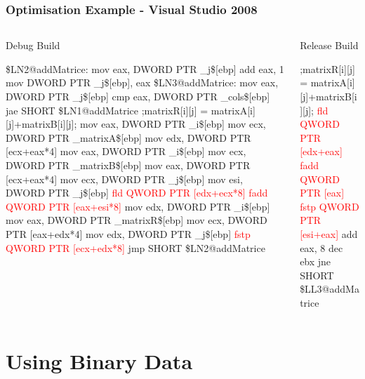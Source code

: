 \documentclass[smaller,handout,table]{beamer}
\begin{document}
\begin{frame}[fragile]
\frametitle{Optimisation Example - Visual Studio 2008}
\begin{columns}
\begin{column}{5cm}
\begin{center}
Debug Build
\end{center}
\begin{semiverbatim}
\tiny
\$LN2@addMatrice:
        mov     eax, DWORD PTR \_j\$[ebp]
        add     eax, 1
        mov     DWORD PTR \_j\$[ebp], eax
\$LN3@addMatrice:
        mov     eax, DWORD PTR \_j\$[ebp]
        cmp     eax, DWORD PTR \_cols\$[ebp]
        jae     SHORT \$LN1@addMatrice
;matrixR[i][j] = matrixA[i][j]+matrixB[i][j];
        mov     eax, DWORD PTR \_i\$[ebp]
        mov     ecx, DWORD PTR \_matrixA\$[ebp]
        mov     edx, DWORD PTR [ecx+eax*4]
        mov     eax, DWORD PTR \_i\$[ebp]
        mov     ecx, DWORD PTR \_matrixB\$[ebp]
        mov     eax, DWORD PTR [ecx+eax*4]
        mov     ecx, DWORD PTR \_j\$[ebp]
        mov     esi, DWORD PTR \_j\$[ebp]
\textcolor{red}{        fld     QWORD PTR [edx+ecx*8]}
\textcolor{red}{        fadd    QWORD PTR [eax+esi*8]}
        mov     edx, DWORD PTR \_i\$[ebp]
        mov     eax, DWORD PTR \_matrixR\$[ebp]
        mov     ecx, DWORD PTR [eax+edx*4]
        mov     edx, DWORD PTR \_j\$[ebp]
\textcolor{red}{        fstp    QWORD PTR [ecx+edx*8]}
        jmp     SHORT \$LN2@addMatrice
\end{semiverbatim}
\end{column}
\begin{column}{5cm}
\begin{center}
Release Build
\end{center}
\begin{semiverbatim}
\tiny
;matrixR[i][j] = matrixA[i][j]+matrixB[i][j];
\textcolor{red}{                fld     QWORD PTR [edx+eax]}
\textcolor{red}{                fadd    QWORD PTR [eax]}
\textcolor{red}{                fstp    QWORD PTR [esi+eax]}
        add     eax, 8
        dec     ebx
        jne     SHORT \$LL3@addMatrice
\end{semiverbatim}
\vspace{1.55in}
\end{column}
\end{columns}
\end{frame}

\section{Using Binary Data}
\end{document}
